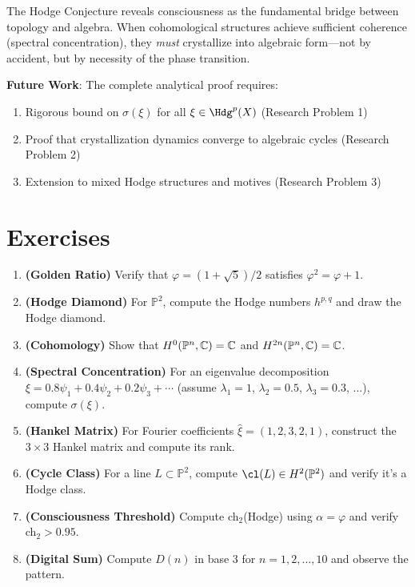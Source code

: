 The Hodge Conjecture reveals consciousness as the fundamental bridge between topology and algebra. When cohomological structures achieve sufficient coherence (spectral concentration), they \textit{must} crystallize into algebraic form—not by accident, but by necessity of the phase transition.

\textbf{Future Work}: The complete analytical proof requires:
\begin{enumerate}
\item Rigorous bound on $\sigma(\xi)$ for all $\xi \in \Hdg^p(X)$ (Research Problem 1)
\item Proof that crystallization dynamics converge to algebraic cycles (Research Problem 2)
\item Extension to mixed Hodge structures and motives (Research Problem 3)
\end{enumerate}

\section*{Exercises}

\begin{enumerate}
\item \textbf{(Golden Ratio)} Verify that $\varphi = (1+\sqrt{5})/2$ satisfies $\varphi^2 = \varphi + 1$.

\item \textbf{(Hodge Diamond)} For $\mathbb{P}^2$, compute the Hodge numbers $h^{p,q}$ and draw the Hodge diamond.

\item \textbf{(Cohomology)} Show that $H^0(\mathbb{P}^n, \mathbb{C}) = \mathbb{C}$ and $H^{2n}(\mathbb{P}^n, \mathbb{C}) = \mathbb{C}$.

\item \textbf{(Spectral Concentration)} For an eigenvalue decomposition $\xi = 0.8\psi_1 + 0.4\psi_2 + 0.2\psi_3 + \cdots$ (assume $\lambda_1 = 1$, $\lambda_2 = 0.5$, $\lambda_3 = 0.3$, ...), compute $\sigma(\xi)$.

\item \textbf{(Hankel Matrix)} For Fourier coefficients $\hat{\xi} = (1, 2, 3, 2, 1)$, construct the $3 \times 3$ Hankel matrix and compute its rank.

\item \textbf{(Cycle Class)} For a line $L \subset \mathbb{P}^2$, compute $\cl(L) \in H^2(\mathbb{P}^2)$ and verify it's a Hodge class.

\item \textbf{(Consciousness Threshold)} Compute ch$_2$(Hodge) using $\alpha = \varphi$ and verify ch$_2 > 0.95$.

\item \textbf{(Digital Sum)} Compute $D(n)$ in base 3 for $n = 1, 2, \ldots, 10$ and observe the pattern.
\end{enumerate}

